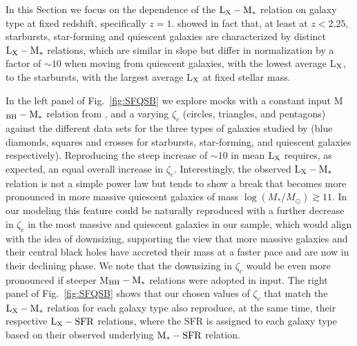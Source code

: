 In this Section we focus on the dependence of the ${\rm L}_{\rm X}-{\rm M}_*$ relation on galaxy type at fixed redshift, specifically $z=1$.
\citet{2020A&A...642A..65C} showed in fact that, at least at $z<2.25$, starbursts, star-forming and quiescent galaxies are characterized by distinct ${\rm L}_{\rm X}-{\rm M}_*$ relations, which are similar in slope but differ in normalization by a factor of $\sim 10$ when moving from quiescent galaxies, with the lowest average L$_{\rm X}$, to the starbursts, with the largest average L$_{\rm X}$ at fixed stellar mass. 

In the left panel of Fig.~\ref{fig:SFQSB} we explore mocks with a constant input M$_{\rm BH}-{\rm M}_*$ relation from \citet{2015ApJ...813...82R}, and a varying $\zeta_c$ (circles, triangles, and pentagons) against the different data sets for the three types of galaxies studied by \citet{2020A&A...642A..65C} (blue diamonds, squares and crosses for starbursts, star-forming, and quiescent galaxies respectively). Reproducing the steep increase of $\sim 10$ in mean ${\rm L}_{\rm X}$ requires, as expected, an equal overall increase in $\zeta_c$. Interestingly, the observed ${\rm L}_{\rm X}-{\rm M}_*$ relation is not a simple power law but tends to show a break that becomes more pronounced in more massive quiescent galaxies of mass $\log (M_*/M_{\odot}) \gtrsim 11$. In our modeling this feature could be naturally reproduced with a further decrease in $\zeta_c$ in the most massive and quiescent galaxies in our sample, which would align with the idea of downsizing, supporting the view that more massive galaxies and their central black holes have accreted their mass at a faster pace and are now in their declining phase. We note that the downsizing in $\zeta_c$ would be even more pronounced if steeper M$_{\rm BH}-{\rm M}_*$ relations were adopted in input. The right panel of Fig.~\ref{fig:SFQSB} shows that our chosen values of $\zeta_c$ that match the ${\rm L}_{\rm X}-{\rm M}_*$ relation for each galaxy type also reproduce, at the same time, their respective ${\rm L}_{\rm X}-{\rm SFR}$ relations, where the SFR is assigned to each galaxy type based on their observed underlying ${\rm M}_*-{\rm SFR}$ relation. 

